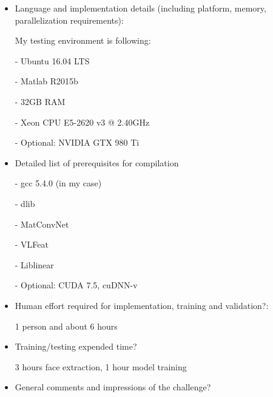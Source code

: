 \documentclass{article}
\begin{document}
\begin{itemize}
\item Language and implementation details (including platform, memory, parallelization requirements): 

My testing environment is following:

- Ubuntu 16.04 LTS

- Matlab R2015b

- 32GB RAM

- Xeon CPU E5-2620 v3 @ 2.40GHz

- Optional: NVIDIA GTX 980 Ti

\item Detailed list of prerequisites for compilation

- gcc 5.4.0 (in my case)

- dlib

- MatConvNet

- VLFeat

- Liblinear

- Optional: CUDA 7.5, cuDNN-v

\item Human effort required for implementation, training and validation?: 

1 person and about 6 hours

\item Training/testing expended time? 

3 hours face extraction, 1 hour model training

\item General comments and impressions of the challenge?
\end{itemize}
\end{document}
